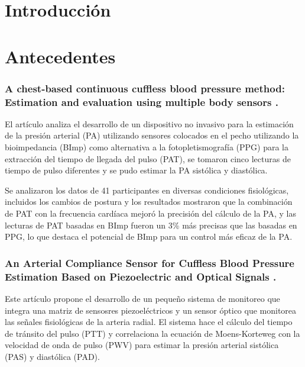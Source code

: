 \setcounter{page}{1} %

\section{Introducción}


\section{Antecedentes}

    \subsubsection*{A chest-based continuous cuffless blood pressure method: Estimation and evaluation using multiple body sensors \cite{bodySensor}.}

    El artículo analiza el desarrollo de un dispositivo no invasivo para la estimación de la presión arterial (PA) utilizando sensores colocados en el pecho utilizando la bioimpedancia (BImp) como alternativa a la fotopletismografía (PPG) para la extracción del tiempo de llegada del pulso (PAT), se tomaron cinco lecturas de tiempo de pulso diferentes y se pudo estimar la PA sistólica y diastólica. 
    
    Se analizaron los datos de 41 participantes en diversas condiciones fisiológicas, incluidos los cambios de postura y los resultados mostraron que la combinación de PAT con la frecuencia cardíaca 
    mejoró la precisión del cálculo de la PA, y las lecturas de PAT basadas en BImp fueron un 3\% más precisas que las basadas en PPG, lo que destaca el potencial de BImp para un control más eficaz de la PA.

    \subsubsection*{An Arterial Compliance Sensor for Cuffless Blood Pressure Estimation Based on Piezoelectric and Optical Signals \cite{piezoelectric}.}

    Este artículo propone el desarrollo de un pequeño sistema de monitoreo que integra una matriz de sensosres piezoeléctricos y un sensor óptico que monitorea las señales fisiológicas de la arteria radial. El sistema hace el cálculo del tiempo de tránsito del pulso (PTT) y correlaciona la ecuación de Moens-Korteweg con la velocidad de onda de pulso (PWV) para estimar la presión arterial sistólica (PAS) y diastólica (PAD).


